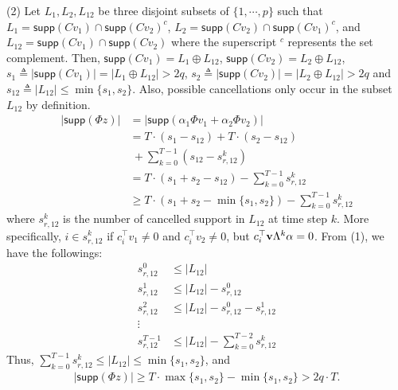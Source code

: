 \documentclass[twocolumn]{autart}    %
\begin{document}
{\begin{pf}
(2) Let $L_1, L_2, L_{12}$ be three disjoint subsets of $\{1,\cdots, p\}$ such that $L_1 = \textsf{supp} (C v_1) \cap \textsf{supp}(C v_2)^c $, $L_2 = \textsf{supp} (Cv_2) \cap \textsf{supp} (C v_1)^c $, and $L_{12} = \textsf{supp} (C v_1) \cap \textsf{supp} (C v_2)$ where the superscript $^c$ represents the set complement. Then, $\textsf{supp} (C v_1)  = L_1 \oplus L_{12}$, $\textsf{supp} (C v_2)  = L_2 \oplus L_{12}$, $ s_1 \triangleq \lvert \textsf{supp} (C v_1) \rvert = \lvert  L_1 \oplus L_{12} \rvert > 2q$,  $s_2 \triangleq \lvert \textsf{supp} ( C v_2) \rvert =  \lvert L_2 \oplus L_{12} \rvert > 2q $ and $s_{12} \triangleq \lvert  L_{12} \rvert \le \min \{s_1, s_2\}$. 
Also, possible cancellations only occur in the subset $L_{12}$ by definition. 
\begin{equation}
\begin{aligned}
	\lvert \textsf{supp} (\Phi z) \rvert &= \lvert \textsf{supp} (\alpha_1 \Phi v_1 + \alpha_2 \Phi v_2) \vert  \\&= T \cdot (s_1 - s_{12}) + T\cdot (s_2 - s_{12}) \\ &~+ \sum_{k=0}^{T-1} (s_{12}- s_{r,12}^k) \\
	&=T \cdot (s_1 + s_2 - s_{12}) - \sum_{k=0}^{T-1} s_{r,12}^k \\&
	\ge T  \cdot(s_1 + s_2 - \min \{ s_1, s_2 \}) - \sum_{k=0}^{T-1} s_{r,12}^k \nonumber
\end{aligned}
\end{equation}
where $s_{r,12}^k$ is the number of cancelled support in $L_{12}$ at time step $k$. 
More specifically, $i \in s_{r,12}^k$ if $c_i^\top v_1 \neq 0$ and $c_i^\top v_2 \neq 0$, but $c_i^\top{\bf v}\Lambda^k \alpha = 0$.
From (1), we have the followings:
\begin{equation}
\begin{aligned}
	s_{r,12}^0 &\le \lvert L_{12} \rvert \\
	s_{r,12}^1 &\le \lvert L_{12} \rvert - s_{r,12}^0 \\
	s_{r,12}^2 &\le \lvert L_{12} \rvert - s_{r,12}^0 - s_{r,12}^1 \\
	\vdots & \\
	s_{r,12}^{T-1} & \le \lvert L_{12} \rvert - \sum_{k=0}^{T-2} s_{r,12}^k \nonumber 
\end{aligned}
\end{equation}
Thus, $\sum_{k=0}^{T-1}  s_{r,12}^k \le \lvert L_{12} \vert \le \min \{s_1, s_2 \} $, and
\begin{equation}
\begin{aligned}
	\lvert \textsf{supp} (\Phi z) \vert \ge T \cdot \max\{ s_1, s_2 \} - \min \{ s_1, s_2 \}  > 2q \cdot T .\nonumber 
\end{aligned}
\end{equation}
\end{pf}


}
\end{document}
